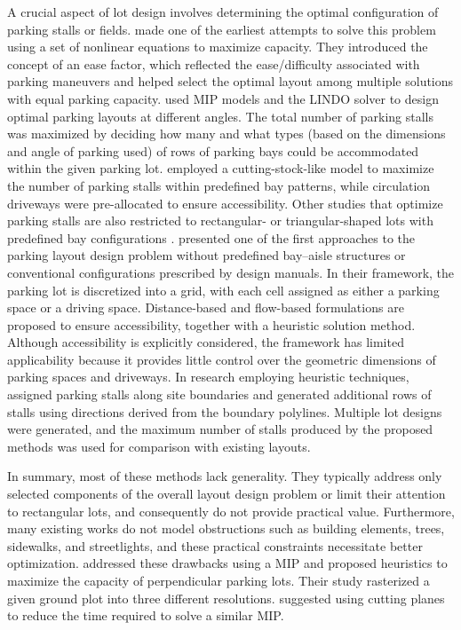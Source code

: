 \documentclass[10pt]{article}
\theoremstyle{definition}
\begin{document}
A crucial aspect of lot design involves determining the optimal configuration of parking stalls or fields. \cite{iranpour1989methodology} made one of the earliest attempts to solve this problem using a set of nonlinear equations to maximize capacity. They introduced the concept of an ease factor, which reflected the ease/difficulty associated with parking maneuvers and helped select the optimal layout among multiple solutions with equal parking capacity. \cite{abdelfatah2014parking} used MIP models and the LINDO solver to design optimal parking layouts at different angles. The total number of parking stalls was maximized by deciding how many and what types (based on the dimensions and angle of parking used) of rows of parking bays could be accommodated within the given parking lot. \cite{yildirim2019} employed a cutting-stock-like model to maximize the number of parking stalls within predefined bay patterns, while circulation driveways were pre-allocated to ensure accessibility. Other studies that optimize parking stalls are also restricted to rectangular- or triangular-shaped lots with predefined bay configurations \citep{syahrini2018, maina2025}. \cite{stiglmayr2020} presented one of the first approaches to the parking layout design problem without predefined bay–aisle structures or conventional configurations prescribed by design manuals. In their framework, the parking lot is discretized into a grid, with each cell assigned as either a parking space or a driving space. Distance-based and flow-based formulations are proposed to ensure accessibility, together with a heuristic solution method. Although accessibility is explicitly considered, the framework has limited applicability because it provides little control over the geometric dimensions of parking spaces and driveways. In research employing heuristic techniques, \cite{cudzik2024} assigned parking stalls along site boundaries and generated additional rows of stalls using directions derived from the boundary polylines. Multiple lot designs were generated, and the maximum number of stalls produced by the proposed methods was used for comparison with existing layouts. 

In summary, most of these methods lack generality. They typically address only selected components of the overall layout design problem or limit their attention to rectangular lots, and consequently do not provide practical value. Furthermore, many existing works do not model obstructions such as building elements, trees, sidewalks, and streetlights, and these practical constraints necessitate better optimization. \cite{stephan2021layout} addressed these drawbacks using a MIP and proposed heuristics to maximize the capacity of perpendicular parking lots. Their study rasterized a given ground plot into three different resolutions. \cite{TRISTAN2022website} suggested using cutting planes to reduce the time required to solve a similar MIP. 
\end{document}
